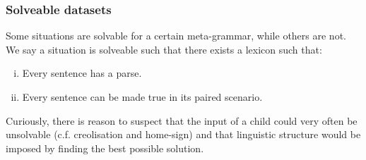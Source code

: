 \documentclass[aspectratio=169]{beamer}
\begin{document}
%
%
\begin{frame}
  \frametitle{Solveable datasets}
Some situations are solvable for a certain meta-grammar, while others are not. 
We say a situation is solveable such that there exists a lexicon such that: 

\begin{enumerate}[i.]
  \item Every sentence has a parse. 
  \item Every sentence can be made true in its paired scenario.
\end{enumerate}

Curiously, there is reason to suspect that the input of a child could very often be unsolvable (c.f. creolisation and home-sign) and that linguistic structure would be imposed by finding the best possible solution.
\end{frame}
%
%
\end{document}
